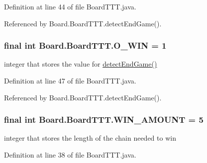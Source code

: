 Definition at line 44 of file Board\+T\+T\+T.\+java.



Referenced by Board.\+Board\+T\+T\+T.\+detect\+End\+Game().

\hypertarget{class_board_1_1_board_t_t_t_a989aacd76a6193fe54a4500dd8151b41}{}
\subsubsection[{O\+\_\+\+W\+I\+N}]{\setlength{\rightskip}{0pt plus 5cm}final int Board.\+Board\+T\+T\+T.\+O\+\_\+\+W\+I\+N = 1\hspace{0.3cm}{\ttfamily [static]}}\label{class_board_1_1_board_t_t_t_a989aacd76a6193fe54a4500dd8151b41}
integer that stores the value for \hyperlink{class_board_1_1_board_t_t_t_a08f36da4210111d8f129be28a550334e}{detect\+End\+Game()} 

Definition at line 47 of file Board\+T\+T\+T.\+java.



Referenced by Board.\+Board\+T\+T\+T.\+detect\+End\+Game().

\hypertarget{class_board_1_1_board_t_t_t_ab11d997e2ea0983b566f23c4685767f6}{}
\subsubsection[{W\+I\+N\+\_\+\+A\+M\+O\+U\+N\+T}]{\setlength{\rightskip}{0pt plus 5cm}final int Board.\+Board\+T\+T\+T.\+W\+I\+N\+\_\+\+A\+M\+O\+U\+N\+T = 5\hspace{0.3cm}{\ttfamily [private]}}\label{class_board_1_1_board_t_t_t_ab11d997e2ea0983b566f23c4685767f6}
integer that stores the length of the chain needed to win 

Definition at line 38 of file Board\+T\+T\+T.\+java.

\hypertarget{class_board_1_1_board_t_t_t_ab77ee706643fb1825e78f6b8dcacc021}{}
